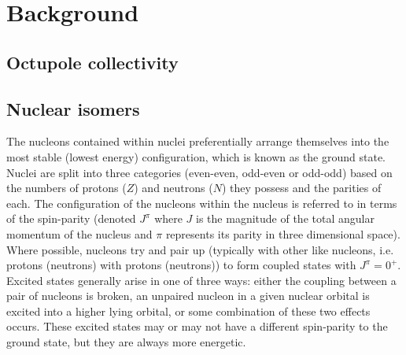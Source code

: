 \documentclass[12pt,a4paper]{article}
\begin{document}
\section*{Background}

\subsection*{Octupole collectivity}

\medskip


\subsection*{Nuclear isomers}
\medskip
The nucleons contained within nuclei preferentially arrange themselves into the most stable (lowest energy) configuration, which is known as the ground state.
Nuclei are split into three categories (even-even, odd-even or odd-odd) based on the numbers of protons ($Z$) and neutrons ($N$) they possess and the parities of each.
The configuration of the nucleons within the nucleus is referred to in terms of the spin-parity (denoted $J^\pi$ where $J$ is the magnitude of the total angular momentum of the nucleus and $\pi$ represents its parity in three dimensional space). 
Where possible, nucleons try and pair up (typically with other like nucleons, i.e. protons (neutrons) with protons (neutrons)) to form coupled states with $J^\pi = 0^+$. 
Excited states generally arise in one of three ways: either the coupling between a pair of nucleons is broken, an unpaired nucleon in a given nuclear orbital is excited into a higher lying orbital, or some combination of these two effects occurs. 
These excited states may or may not have a different spin-parity to the ground state, but they are always more energetic.
\end{document}
